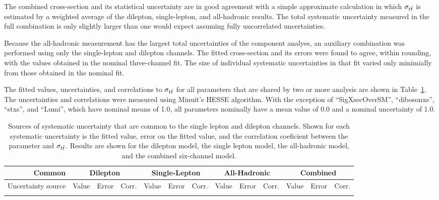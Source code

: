 The combined cross-section and its statistical uncertainty are in good agreement with a simple approximate calculation in which $\sigma_{t\bar{t}}$ is estimated by a weighted average of the dilepton, single-lepton, and all-hadronic results.
The total systematic uncertainty measured in the full combination is only slightly larger than one would expect assuming fully uncorrelated uncertainties. 

Because the all-hadronic measurement has the largest total uncertainties of the component analyes, an auxiliary combination was performed using only the single-lepton and dilepton channels.
The fitted cross-section and its errors were found to agree, within rounding, with the values obtained in the nominal three-channel fit.
The size of individual systematic uncertainties in that fit varied only minimially from those obtained in the nominal fit.






The fitted values, uncertainties, and correlations to $\sigma_{ t\bar{t} }$ for all parameters that are shared by two or more analysis are shown in Table~\ref{tab:commonFittedParams}.
The uncertainties and correlations were measured using Minuit's HESSE algorithm.
With the exception of ``SigXsecOverSM'', ``dibosonxs'', ``stxs'', and ``Lumi'', which have nominal means of 1.0, all parameters nominally have a mean value of 0.0 and a nominal uncertainty of 1.0.



\begin{table}[htbp]

  \begin{center}  
    \begin{tabular}{|r|ccc|ccc|ccc|ccc|} 
      \hline
      Common & \multicolumn{3}{|c|}{Dilepton}  & \multicolumn{3}{|c|}{Single-Lepton} & \multicolumn{3}{|c|}{All-Hadronic} & \multicolumn{3}{|c|}{Combined} \\
      \hline
      Uncertainty source & Value & Error & Corr. & Value & Error & Corr. & Value & Error & Corr. & Value & Error & Corr. \\
      \hline
      \tiny
      
      \hline
    \end{tabular}
  \end{center}
  \caption{ \label{tab:commonFittedParams} Sources of systematic uncertainty that are common to the single lepton and dilepton channels.  Shown for each systematic uncertainty is the fitted value, error on the fitted value, and the correlation coeficient between the parameter and $\sigma_{t\bar{t}}$.  Results are shown for the dilepton model, the single lepton model, the all-hadronic model, and the combined six-channel model. }
\end{table}

